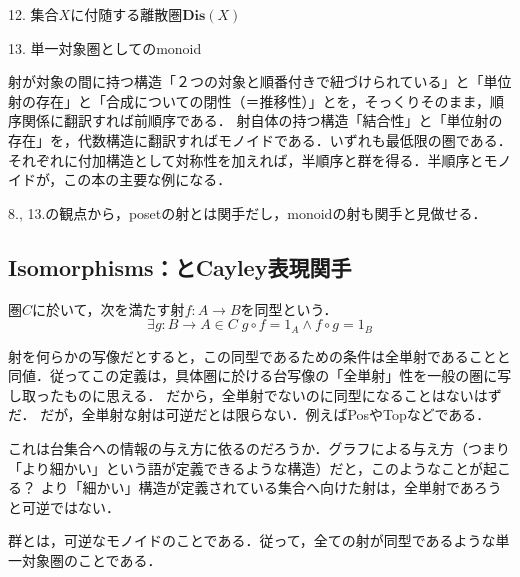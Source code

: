 \documentclass[uplatex, 12pt, dvipdfmx]{jsarticle}
\begin{document}
12. 集合$X$に付随する離散圏$\mathbf{Dis}(X)$

13. 単一対象圏としてのmonoid

射が対象の間に持つ構造「２つの対象と順番付きで紐づけられている」と「単位射の存在」と「合成についての閉性（＝推移性）」とを，そっくりそのまま，順序関係に翻訳すれば前順序である．
射自体の持つ構造「結合性」と「単位射の存在」を，代数構造に翻訳すればモノイドである．いずれも最低限の圏である．
それぞれに付加構造として対称性を加えれば，半順序と群を得る．半順序とモノイドが，この本の主要な例になる．

8., 13.の観点から，posetの射とは関手だし，monoidの射も関手と見做せる．

\subsection{Isomorphisms：とCayley表現関手}

\begin{definition}[同型]
    圏$C$に於いて，次を満たす射$f:A\to B$を同型という．
    \[ \exists g:B\to A\in C\; g\circ f=1_A \land f\circ g=1_B \]
\end{definition}
\begin{remark*}
    射を何らかの写像だとすると，この同型であるための条件は全単射であることと同値．従ってこの定義は，具体圏に於ける台写像の「全単射」性を一般の圏に写し取ったものに思える．
    だから，全単射でないのに同型になることはないはずだ．
    だが，全単射な射は可逆だとは限らない．例えばPosやTopなどである．

    これは台集合への情報の与え方に依るのだろうか．グラフによる与え方（つまり「より細かい」という語が定義できるような構造）だと，このようなことが起こる？
    より「細かい」構造が定義されている集合へ向けた射は，全単射であろうと可逆ではない．
\end{remark*}

\begin{definition}[群]
    群とは，可逆なモノイドのことである．従って，全ての射が同型であるような単一対象圏のことである．
\end{definition}
\end{document}
